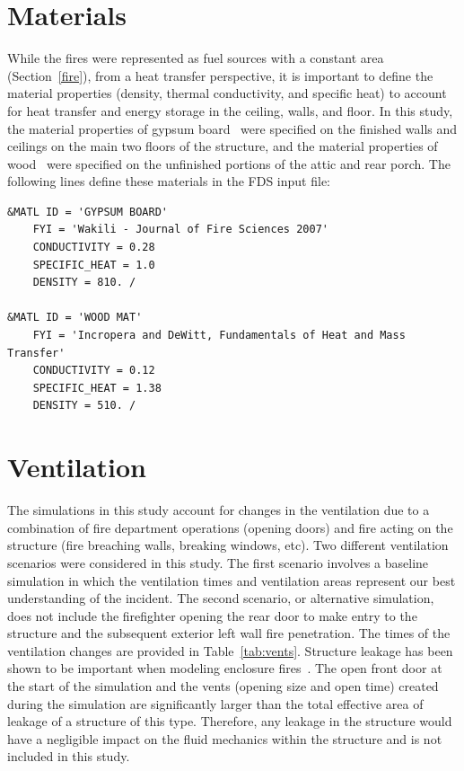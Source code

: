 \documentclass[12pt,oneside]{book}
\begin{document}
\section{Materials}
\label{matl}
While the fires were represented as fuel sources with a constant area (Section~\ref{fire}), from a heat transfer perspective, it is important to define the material properties (density, thermal conductivity, and specific heat) to account for heat transfer and energy storage in the ceiling, walls, and floor. In this study, the material properties of gypsum board~\cite{WAKILI2007} were specified on the finished walls and ceilings on the main two floors of the structure, and the material properties of wood~\cite{Incropera:1} were specified on the unfinished portions of the attic and rear porch. The following lines define these materials in the FDS input file:

\begin{lstlisting}
&MATL ID = 'GYPSUM BOARD'
    FYI = 'Wakili - Journal of Fire Sciences 2007' 
    CONDUCTIVITY = 0.28
    SPECIFIC_HEAT = 1.0
    DENSITY = 810. /

&MATL ID = 'WOOD MAT'
    FYI = 'Incropera and DeWitt, Fundamentals of Heat and Mass Transfer'
    CONDUCTIVITY = 0.12
    SPECIFIC_HEAT = 1.38
    DENSITY = 510. / 
\end{lstlisting}

\section{Ventilation}
\label{Vents}
The simulations in this study account for changes in the ventilation due to a combination of fire department operations (opening doors) and fire acting on the structure (fire breaching walls, breaking windows, etc). Two different ventilation scenarios were considered in this study. The first scenario involves a baseline simulation in which the ventilation times and ventilation areas represent our best understanding of the incident. The second scenario, or alternative simulation, does not include the firefighter opening the rear door to make entry to the structure and the subsequent exterior left wall fire penetration. The times of the ventilation changes are provided in Table~\ref{tab:vents}. Structure leakage has been shown to be important when modeling enclosure fires~\cite{beal2009}. The open front door at the start of the simulation and the vents (opening size and open time) created during the simulation are significantly larger than the total effective area of leakage of a structure of this type. Therefore, any leakage in the structure would have a negligible impact on the fluid mechanics within the structure and is not included in this study.
\end{document}
